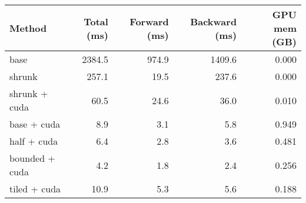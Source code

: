 \begin{tabular}{lrrrr}
\hline
 Method         &   Total (ms) &   Forward (ms) &   Backward (ms) &   GPU mem (GB) \\
\hline
 base           &       2384.5 &          974.9 &          1409.6 &          0.000 \\
 shrunk         &        257.1 &           19.5 &           237.6 &          0.000 \\
 shrunk + cuda  &         60.5 &           24.6 &            36.0 &          0.010 \\
 base + cuda    &          8.9 &            3.1 &             5.8 &          0.949 \\
 half + cuda    &          6.4 &            2.8 &             3.6 &          0.481 \\
 bounded + cuda &          4.2 &            1.8 &             2.4 &          0.256 \\
 tiled + cuda   &         10.9 &            5.3 &             5.6 &          0.188 \\
\hline
\end{tabular}
